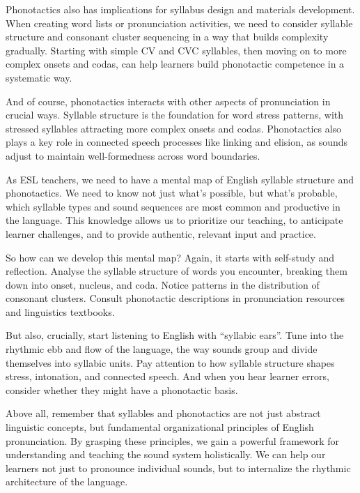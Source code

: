 Phonotactics also has implications for syllabus design and materials development. When creating word lists or pronunciation activities, we need to consider syllable structure and consonant cluster sequencing in a way that builds complexity gradually. Starting with simple CV and CVC syllables, then moving on to more complex onsets and codas, can help learners build phonotactic competence in a systematic way.

And of course, phonotactics interacts with other aspects of pronunciation in crucial ways. Syllable structure is the foundation for word stress patterns, with stressed syllables attracting more complex onsets and codas. Phonotactics also plays a key role in connected speech processes like linking and elision, as sounds adjust to maintain well-formedness across word boundaries.

As ESL teachers, we need to have a mental map of English syllable structure and phonotactics. We need to know not just what's possible, but what's probable, which syllable types and sound sequences are most common and productive in the language. This knowledge allows us to prioritize our teaching, to anticipate learner challenges, and to provide authentic, relevant input and practice.

So how can we develop this mental map? Again, it starts with self-study and reflection. Analyse the syllable structure of words you encounter, breaking them down into onset, nucleus, and coda. Notice patterns in the distribution of consonant clusters. Consult phonotactic descriptions in pronunciation resources and linguistics textbooks.

But also, crucially, start listening to English with \enquote{syllabic ears}. Tune into the rhythmic ebb and flow of the language, the way sounds group and divide themselves into syllabic units. Pay attention to how syllable structure shapes stress, intonation, and connected speech. And when you hear learner errors, consider whether they might have a phonotactic basis.

Above all, remember that syllables and phonotactics are not just abstract linguistic concepts, but fundamental organizational principles of English pronunciation. By grasping these principles, we gain a powerful framework for understanding and teaching the sound system holistically. We can help our learners not just to pronounce individual sounds, but to internalize the rhythmic architecture of the language.


